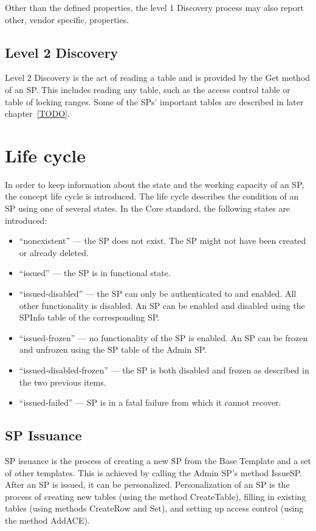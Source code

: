 Other than the defined properties, the level 1 Discovery process may also report other, vendor specific, properties.

\subsection{Level 2 Discovery}

Level 2 Discovery is the act of reading a table and is provided by the Get method of an SP. This includes reading any table, such as the access control table or table of locking ranges. Some of the SPs' important tables are described in later chapter~\ref{TODO}.

\section{Life cycle}

In order to keep information about the state and the working capacity of an SP, the concept life cycle is introduced. The life cycle describes the condition of an SP using one of several states. In the Core standard, the following states are introduced: 
\begin{itemize}
\item ``nonexistent'' --- the SP does not exist. The SP might not have been created or already deleted.
\item ``issued'' --- the SP is in functional state.
\item ``issued-disabled'' --- the SP can only be authenticated to and enabled. All other functionality is disabled. An SP can be enabled and disabled using the SPInfo table of the corresponding SP.
\item ``issued-frozen'' --- no functionality of the SP is enabled. An SP can be frozen and unfrozen using the SP table of the Admin SP.
\item ``issued-disabled-frozen'' --- the SP is both disabled and frozen as described in the two previous items.
\item ``issued-failed'' --- SP is in a fatal failure from which it cannot recover.
\end{itemize}

\subsection{SP Issuance}

SP issuance is the process of creating a new SP from the Base Template and a set of other templates. This is achieved by calling the Admin SP's method IssueSP. After an SP is issued, it can be personalized. Personalization of an SP is the process of creating new tables (using the method CreateTable), filling in existing tables (using methods CreateRow and Set), and setting up access control (using the method AddACE).

